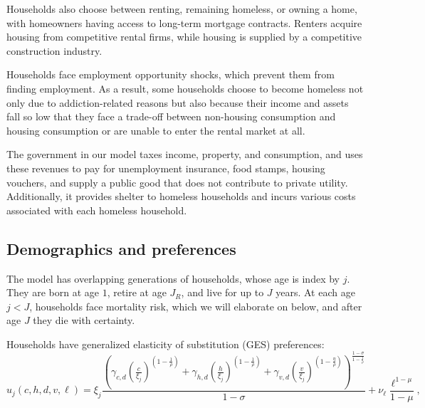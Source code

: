 \documentclass[parskip=full]{article}
\begin{document}
Households also choose between renting, remaining homeless, or owning a home, with homeowners having access to long-term mortgage contracts. Renters acquire housing from competitive rental firms, while housing is supplied by a competitive construction industry.

Households face employment opportunity shocks, which prevent them from finding employment. As a result, some households choose to become homeless not only due to addiction-related reasons but also because their income and assets fall so low that they face a trade-off between non-housing consumption and housing consumption or are unable to enter the rental market at all.

The government in our model taxes income, property, and consumption, and uses these revenues to pay for unemployment insurance, food stamps, housing vouchers, and supply a public good that does not contribute to private utility. Additionally, it provides shelter to homeless households and incurs various costs associated with each homeless household.

\subsection{Demographics and preferences}

The model has overlapping generations of households, whose age is index by $j$. They are born at age $1$, retire at age $J_R$, and live for up to $J$ years. At each age $j<J$, households face mortality risk, which we will elaborate on below, and after age $J$ they die with certainty. 

Households have generalized elasticity of substitution (GES) preferences: 
\begin{equation}
    u_j(c,h,d,v,\ell)=\xi_{j}\frac{\left(\gamma_{c,d} \left(\frac{c}{\xi_{j}}\right)^{\left(1-\frac{1}{\rho}\right)} + \gamma_{h,d} \left(\frac{h}{\xi_{j}}\right)^{\left(1-\frac{1}{\rho}\right)} + \gamma_{v,d} \left(\frac{v}{\xi_{j}}\right)^{\left(1-\frac{\eta}{\rho}\right)} \right)^{\frac{1-\sigma}{1-\frac{1}{\rho}}}}{1-\sigma} + \nu_{\ell}\frac{\ell^{1-\mu}}{1-\mu},
\end{equation}
\end{document}
